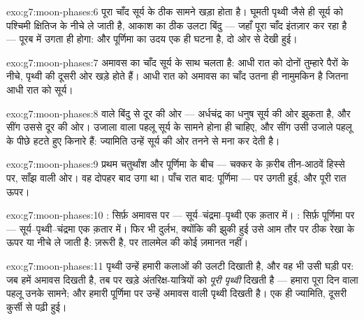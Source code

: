 \begin{solution}{exo:g7:moon-phases:6}
पूरा चाँद सूर्य के ठीक सामने खड़ा होता है। घूमती पृथ्वी जैसे ही सूर्य
को पश्चिमी क्षितिज के नीचे ले जाती है, आकाश का ठीक उलटा बिंदु ---
जहाँ पूरा चाँद इंतज़ार कर रहा है --- पूरब में उगता ही होगा: 
और पूर्णिमा का उदय एक ही घटना है, दो ओर से देखी हुई।
\end{solution}

\begin{solution}{exo:g7:moon-phases:7}
अमावस का चाँद सूर्य के साथ चलता है: आधी रात को दोनों तुम्हारे पैरों
के नीचे, पृथ्वी की दूसरी ओर खड़े होते हैं। आधी रात को अमावस का चाँद
उतना ही नामुमकिन है जितना आधी रात को सूर्य।
\end{solution}

\begin{solution}{exo:g7:moon-phases:8}
 वाले बिंदु से दूर की ओर --- अर्धचंद्र का धनुष सूर्य की ओर
झुकता है, और सींग उससे दूर की ओर। उजाला वाला पहलू सूर्य के सामने होना
ही चाहिए, और सींग उसी उजाले पहलू के पीछे हटते हुए किनारे हैं: ज्यामिति
उन्हें सूर्य की ओर तनने से मना कर देती है।
\end{solution}

\begin{solution}{exo:g7:moon-phases:9}
प्रथम चतुर्थांश और पूर्णिमा के बीच --- चक्कर के क़रीब तीन-आठवें
हिस्से पर, साँझ वाली ओर। वह दोपहर बाद उगा था। पाँच रात बाद: पूर्णिमा
---  पर उगती हुई, और पूरी रात ऊपर।
\end{solution}

\begin{solution}{exo:g7:moon-phases:10}
: सिर्फ़ अमावस पर --- सूर्य--चंद्रमा--पृथ्वी एक क़तार में।
: सिर्फ़ पूर्णिमा पर --- सूर्य--पृथ्वी--चंद्रमा एक क़तार
में। फिर भी दुर्लभ, क्योंकि  की झुकी हुई  उसे आम तौर पर
ठीक रेखा के ऊपर या नीचे ले जाती है:  ज़रूरी है, पर तालमेल की
कोई ज़मानत नहीं।
\end{solution}

\begin{solution}{exo:g7:moon-phases:11}
पृथ्वी उन्हें हमारी कलाओं की उलटी  दिखाती है, और वह भी उसी घड़ी
पर: जब हमें अमावस दिखती है, तब  पर खड़े अंतरिक्ष-यात्रियों को
\emph{पूरी पृथ्वी} दिखती है --- हमारा पूरा दिन वाला पहलू उनके सामने;
और हमारी पूर्णिमा पर उन्हें अमावस वाली पृथ्वी दिखती है। एक ही
ज्यामिति, दूसरी कुर्सी से पढ़ी हुई।
\end{solution}

